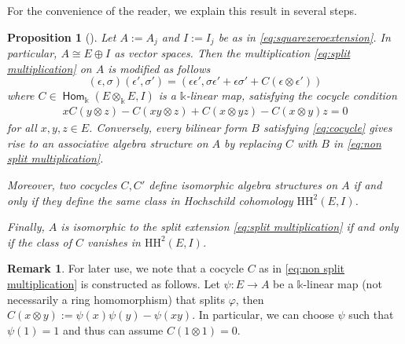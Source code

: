 \documentclass[a4paper,11pt, reqno]{amsart}
\newcommand{\opname}[1]{\operatorname{\mathsf{#1}}}
\newcommand{\Hom}{\opname{Hom}}
\theoremstyle{plain}
\newtheorem{proposition}[dummy]{Proposition}
\theoremstyle{definition}
\newtheorem{remark}[dummy]{Remark}
\numberwithin{equation}{section}
\begin{document}
For the convenience of the reader, we explain this result in several steps.

\begin{proposition}[{\cite[Propositions 6.2 \& 6.3]{Hochschild}}]\label{P:Hochschildcocylce}
    Let $A:=A_j$ and $I:=I_j$ be as in \eqref{eq:squarezeroextension}. In particular, $A \cong E \oplus I$ as vector spaces. Then the multiplication \eqref{eq:split multiplication} on $A$ is modified as follows
\begin{equation} \label{eq:non split multiplication}
    (\epsilon, \sigma)(\epsilon', \sigma')=(\epsilon \epsilon', \sigma \epsilon' + \epsilon \sigma' + C(\epsilon \otimes \epsilon'))
\end{equation}
    where $C \in \Hom_\mathbb{k}(E \otimes_\mathbb{k} E, I)$ is a $\mathbb k$-linear map,  
satisfying the cocycle condition
\begin{align}\label{eq:cocycle}
xC(y \otimes z)-C(xy \otimes z)+C(x \otimes yz) -C(x \otimes y)z=0
\end{align}
for all $x, y, z \in E$. Conversely, every bilinear form $B$ satisfying \eqref{eq:cocycle} gives rise to an associative algebra structure on $A$ by replacing $C$ with $B$ in \eqref{eq:non split multiplication}.

Moreover, two cocycles $C, C'$ define isomorphic algebra structures on $A$ if and only if they define the same class in Hochschild cohomology $\mathrm{HH}^2(E, I)$.

     
Finally, $A$ is isomorphic to the split extension \eqref{eq:split multiplication} if and only if the class of $C$ vanishes in $\mathrm{HH}^2(E, I)$.
\end{proposition}

\begin{remark}
    For later use, we note that a cocycle $C$ as in \eqref{eq:non split multiplication} is constructed as follows. Let $\psi \colon E \to A$ be a $\mathbb{k}$-linear map (not necessarily a ring homomorphism) that splits $\varphi$, then $C(x \otimes y):=\psi(x)\psi(y)-\psi(xy)$. In particular, we can choose $\psi$ such that $\psi(1)=1$ and thus can assume $C(1 \otimes 1)=0$.
\end{remark}
\end{document}

